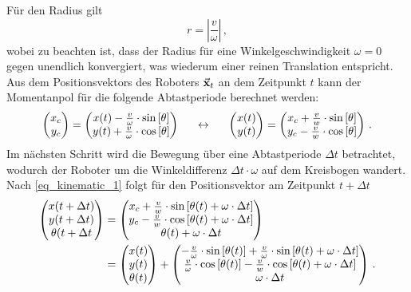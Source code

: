 Für den Radius gilt
\begin{equation}
r = \left\vert \frac{v}{\omega}\right\vert\,,
\end{equation}
wobei zu beachten ist, dass der Radius für eine Winkelgeschwindigkeit $\omega=0$ gegen unendlich konvergiert, was wiederum einer reinen Translation entspricht. Aus dem Positionsvektors des Roboters $\vec{\mathbf{x}}_t$ an dem Zeitpunkt $t$ kann der Momentanpol für die folgende Abtastperiode berechnet werden:
\begin{equation}
\label{eq_kinematic_1}
\begin{pmatrix}
x_c \\ y_c
\end{pmatrix} = \begin{pmatrix}
x(t) - \frac{v}{\omega}\cdot \text{sin}\left[ {\theta} \right] \\ y(t) + \frac{v}{\omega}\cdot \text{cos}\left[ {\theta} \right]
\end{pmatrix} \hspace{15pt}\leftrightarrow\hspace{15pt} 
\begin{pmatrix}
x(t) \\ y(t)
\end{pmatrix} = \begin{pmatrix}
x_c + \frac{v}{w}\cdot \text{sin}\left[ {\theta} \right] \\ y_c - \frac{v}{w}\cdot \text{cos}\left[ {\theta} \right]
\end{pmatrix}\,.
\end{equation}
Im nächsten Schritt wird die Bewegung über eine Abtastperiode $\Delta t$ betrachtet, wodurch der Roboter um die Winkeldifferenz $\Delta t\cdot \omega$ auf dem Kreisbogen wandert. Nach \ref{eq_kinematic_1} folgt für den Positionsvektor am Zeitpunkt $t+\Delta t$
\begin{equation}
\label{eq_kinematic_2}
\begin{split}
\begin{pmatrix}
x(t+\Delta t) \\ y(t+\Delta t) \\ \theta(t+\Delta t
\end{pmatrix} &= \begin{pmatrix}
x_c + \frac{v}{w}\cdot \text{sin}\left[ {\theta(t)+\omega\cdot \Delta t} \right] \\ y_c - \frac{v}{w}\cdot \text{cos}\left[ {\theta(t)+\omega \cdot \Delta t} \right] \\ \theta(t) + \omega\cdot \Delta t
\end{pmatrix}\\
& = \begin{pmatrix}
x(t) \\ y(t) \\ \theta(t)
\end{pmatrix} + \begin{pmatrix}
-\frac{v}{\omega}\cdot\text{sin}\left[ {\theta(t)} \right] + \frac{v}{\omega}\cdot \text{sin}\left[ {\theta(t)+\omega \cdot \Delta t} \right] \\
\frac{v}{\omega}\cdot \text{cos}\left[ {\theta(t)} \right] - \frac{v}{w}\cdot \text{cos}\left[ {\theta(t)+\omega \cdot \Delta t} \right]\\
\omega\cdot \Delta t
\end{pmatrix}\,.
\end{split}
\end{equation}
